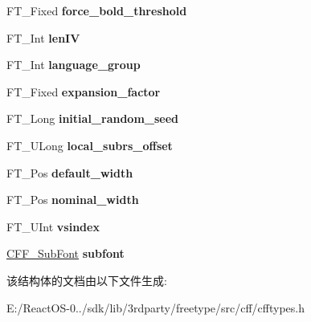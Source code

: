 \begin{DoxyCompactItemize}
\item 
\mbox{\label{struct_c_f_f___private_rec___ad69b4ba0aa06ff07d0f9b3c5976823e0}} 
F\+T\+\_\+\+Fixed {\bfseries force\+\_\+bold\+\_\+threshold}
\item 
\mbox{\label{struct_c_f_f___private_rec___a51050ed5a3651b84310874ce1ca58b7d}} 
F\+T\+\_\+\+Int {\bfseries len\+IV}
\item 
\mbox{\label{struct_c_f_f___private_rec___a120626003e63919f417ab81781b88eb4}} 
F\+T\+\_\+\+Int {\bfseries language\+\_\+group}
\item 
\mbox{\label{struct_c_f_f___private_rec___ae3027c426268230846e1cc6e0a649d80}} 
F\+T\+\_\+\+Fixed {\bfseries expansion\+\_\+factor}
\item 
\mbox{\label{struct_c_f_f___private_rec___a5918411de0744d71a085f8b324fa69c1}} 
F\+T\+\_\+\+Long {\bfseries initial\+\_\+random\+\_\+seed}
\item 
\mbox{\label{struct_c_f_f___private_rec___afb51c6902a55f2dc6b4135f165a970c5}} 
F\+T\+\_\+\+U\+Long {\bfseries local\+\_\+subrs\+\_\+offset}
\item 
\mbox{\label{struct_c_f_f___private_rec___adcb4cd9c46009970b133fabe9cdaa4c4}} 
F\+T\+\_\+\+Pos {\bfseries default\+\_\+width}
\item 
\mbox{\label{struct_c_f_f___private_rec___aa1b8270b92aa646ad76e935875393794}} 
F\+T\+\_\+\+Pos {\bfseries nominal\+\_\+width}
\item 
\mbox{\label{struct_c_f_f___private_rec___a718a54d0d375a4b9babd12ecbf5fac6d}} 
F\+T\+\_\+\+U\+Int {\bfseries vsindex}
\item 
\mbox{\label{struct_c_f_f___private_rec___a240fcab624e8b7c040d206f87ac79163}} 
\hyperlink{struct_c_f_f___sub_font_rec__}{C\+F\+F\+\_\+\+Sub\+Font} {\bfseries subfont}
\end{DoxyCompactItemize}


该结构体的文档由以下文件生成\+:\begin{DoxyCompactItemize}
\item 
E\+:/\+React\+O\+S-\/0../sdk/lib/3rdparty/freetype/src/cff/cfftypes.\+h\end{DoxyCompactItemize}
